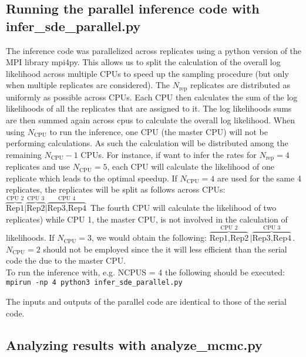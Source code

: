\documentclass[]{article}   %
\begin{document}
\subsection{Running the parallel inference code with infer\_sde\_parallel.py}

The inference code was parallelized across replicates using a python version of the MPI library mpi4py. This allows us to split the calculation of the overall log likelihood across multiple CPUs to speed up the sampling procedure (but only when multiple replicates are considered). The $N_{\textrm{rep}}$ replicates are distributed as uniformly as possible across CPUs. Each CPU then calculates the sum of the log likelihoods of all the replicates that are assigned to it. The log likelihoods sums are then summed again across cpus to calculate the overall log likelihood. When using $N_{\textrm{CPU}}$ to run the inference, one CPU (the master CPU) will not be performing calculations. As such the calculation will be distributed among the remaining $N_{\textrm{CPU}} -1$ CPUs. For instance, if want to infer the rates for $N_{\textrm{rep}} = 4$ replicates and use  $N_{\textrm{CPU}}=5$, each CPU will calculate the likelihood of one replicate which leads to the optimal speedup. If $N_{\textrm{CPU}}=4$ are used for the same 4 replicates, the replicates will be split as follows across CPUs: $\overbrace{\textrm{Rep1}}^{\textrm{CPU 2}} \vert \overbrace{\textrm{Rep2}}^{\textrm{CPU 3}} \vert \overbrace{\textrm{Rep3},\textrm{Rep4}}^{\textrm{CPU 4}}$ The fourth CPU will calculate the likelihood of two replicates) while CPU 1, the master CPU, is not involved in the calculation of likelihoods. If $N_{\textrm{CPU}}=3$, we would obtain the following: $\overbrace{\textrm{Rep1},\textrm{Rep2}}^{\textrm{CPU 2}} \vert \overbrace{\textrm{Rep3},\textrm{Rep4}}^{\textrm{CPU 3}}$. $N_{\textrm{CPU}}=2$ should not be employed since the it will less efficient than the serial code the due to the master CPU.\\


To run the inference with, e.g. NCPUS = 4 the following should be executed:\\
{\tt mpirun -np 4 python3 infer\_sde\_parallel.py}


The inputs and outputs of the parallel code are identical to those of the serial code.

\subsection{Analyzing results with analyze\_mcmc.py}
\end{document}
